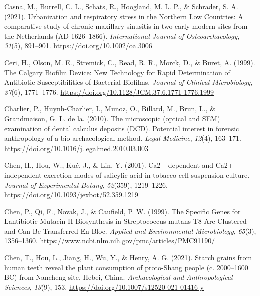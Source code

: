 \documentclass[
  letterpaper,
]{book}
\newlength{\cslhangindent}
\newlength{\cslentryspacingunit} %
\newenvironment{CSLReferences}[2] %
 {%
  \setlength{\parindent}{0pt}
  \ifodd #1
  \let\oldpar\par
  \def\par{\hangindent=\cslhangindent\oldpar}
  \fi
  \setlength{\parskip}{#2\cslentryspacingunit}
 }%
 {}
\begin{document}
\begin{CSLReferences}{1}{0}
\leavevmode{}%
Casna, M., Burrell, C. L., Schats, R., Hoogland, M. L. P., \& Schrader,
S. A. (2021). Urbanization and respiratory stress in the {Northern Low
Countries}: {A} comparative study of chronic maxillary sinusitis in two
early modern sites from the {Netherlands} ({AD} 1626--1866).
\emph{International Journal of Osteoarchaeology}, \emph{31}(5),
891--901. \url{https://doi.org/10.1002/oa.3006}

\leavevmode{}%
Ceri, H., Olson, M. E., Stremick, C., Read, R. R., Morck, D., \& Buret,
A. (1999). The {Calgary Biofilm Device}: {New Technology} for {Rapid
Determination} of {Antibiotic Susceptibilities} of {Bacterial Biofilms}.
\emph{Journal of Clinical Microbiology}, \emph{37}(6), 1771--1776.
\url{https://doi.org/10.1128/JCM.37.6.1771-1776.1999}

\leavevmode{}%
Charlier, P., Huynh-Charlier, I., Munoz, O., Billard, M., Brun, L., \&
Grandmaison, G. L. de la. (2010). The microscopic (optical and {SEM})
examination of dental calculus deposits ({DCD}). {Potential} interest in
forensic anthropology of a bio-archaeological method. \emph{Legal
Medicine}, \emph{12}(4), 163--171.
\url{https://doi.org/10.1016/j.legalmed.2010.03.003}

\leavevmode{}%
Chen, H., Hou, W., Kuć, J., \& Lin, Y. (2001). Ca2+‐dependent and
{Ca2}+‐independent excretion modes of salicylic acid in tobacco cell
suspension culture. \emph{Journal of Experimental Botany},
\emph{52}(359), 1219--1226.
\url{https://doi.org/10.1093/jexbot/52.359.1219}

\leavevmode{}%
Chen, P., Qi, F., Novak, J., \& Caufield, P. W. (1999). The {Specific
Genes} for {Lantibiotic Mutacin II Biosynthesis} in {Streptococcus}
mutans {T8 Are Clustered} and {Can Be} {Transferred En Bloc}.
\emph{Applied and Environmental Microbiology}, \emph{65}(3), 1356--1360.
\url{https://www.ncbi.nlm.nih.gov/pmc/articles/PMC91190/}

\leavevmode{}%
Chen, T., Hou, L., Jiang, H., Wu, Y., \& Henry, A. G. (2021). Starch
grains from human teeth reveal the plant consumption of proto-{Shang}
people (c. 2000--1600 {BC}) from {Nancheng} site, {Hebei}, {China}.
\emph{Archaeological and Anthropological Sciences}, \emph{13}(9), 153.
\url{https://doi.org/10.1007/s12520-021-01416-y}


\end{CSLReferences}
\end{document}
